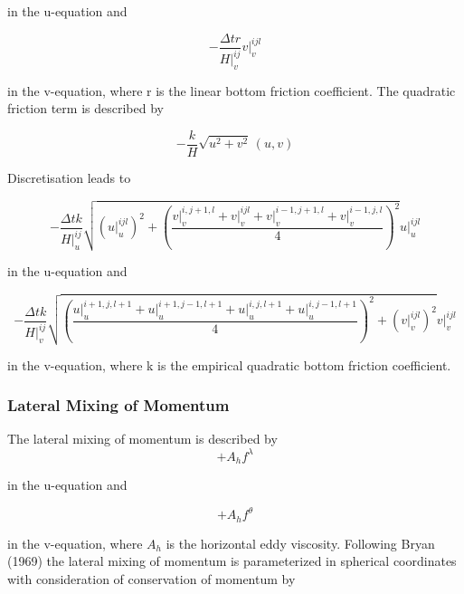 \documentclass[a4paper]{article}
\begin{document}
in the u-equation and 

\begin{equation}
  -\frac {\Delta tr}{H\vert^{ij}_v} v\vert^{ijl}_v
\end{equation}

in the v-equation, where r is the linear bottom friction coefficient.
The quadratic friction term is described by

\begin{equation}
  -\frac kH \sqrt{u^2+v^2}\,(u,v)
\end{equation}

Discretisation leads to

\begin{equation}
  -\frac {\Delta tk}{H\vert^{ij}_u} \sqrt{(u\vert^{ijl}_u)^2+\left(\frac{v\vert^{i,j+1,l}_v+v\vert^{ijl}_v+v\vert^{i-1,j+1,l}_v+v\vert^{i-1,j,l}_v}4\right)^2}u\vert^{ijl}_u
\end{equation}

in the u-equation and 

\begin{equation}
  -\frac {\Delta tk}{H\vert^{ij}_v} \sqrt{\left(\frac{u\vert^{i+1,j,l+1}_u+u\vert^{i+1,j-1,l+1}_u+u\vert^{i,j,l+1}_u+u\vert^{i,j-1,l+1}_u}4\right)^2+(v\vert^{ijl}_v)^2}v\vert^{ijl}_v
\end{equation}

in the v-equation, where k is the empirical quadratic bottom friction coefficient.

\subsubsection{Lateral Mixing of Momentum}

The lateral mixing of momentum is described by
\begin{equation}
  +A_hf^\lambda
\end{equation}

in the u-equation and 

\begin{equation}
  +A_hf^\theta
\end{equation}

in the v-equation, where $A_h$ is the horizontal eddy viscosity. Following Bryan (1969) the lateral mixing of momentum is
parameterized in spherical coordinates with consideration of conservation of
momentum by
\end{document}
